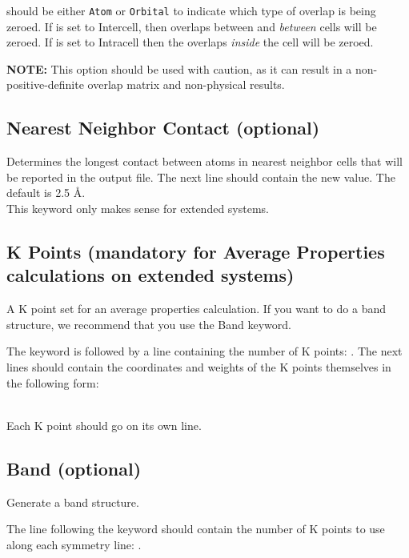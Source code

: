    

 should be either {\tt Atom} or {\tt Orbital} to indicate
which type of overlap is being zeroed.  If  is set to {\sf
Intercell}, then overlaps between  and  
{\em between} cells will be zeroed.  If  is set to {\sf
Intracell} then the overlaps {\em inside} the cell will be zeroed.

{\bf NOTE:}  This option should be used with caution, as it can result
in a non-positive-definite overlap matrix and non-physical results.

\subsection{{\sf Nearest Neighbor Contact} (optional)}

Determines the longest contact between atoms in nearest neighbor cells
that 
will be reported in the output file.  The next line should contain the
new value.  The default is 2.5 \AA. \\

  This keyword only makes sense for extended systems.

\subsection{{\sf K Points} (mandatory for Average Properties
calculations on extended systems)}

A K point set for an average properties calculation.  If you want to
do a band structure, we recommend that you use the {\sf Band} keyword.

The keyword is followed by a line containing the number of K points:
.   The next  lines should contain
the coordinates and weights of the K points themselves in the
following form:

    \\

\noindent Each K point should go on its own line.

\subsection{{\sf Band} (optional)}

Generate a band structure.

The line following the keyword should contain the number of K points
to use along each symmetry line: .


